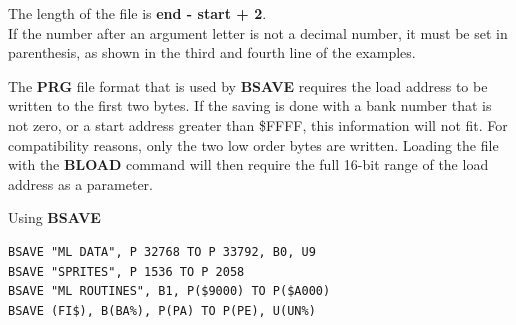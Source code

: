 \begin{description}[leftmargin=2cm,style=nextline]
\item [Remarks:]
   The length of the file is {\bf end - start + 2}. \\
   If the number after an argument letter is not a decimal
   number, it must be set in parenthesis, as shown
   in the third and fourth line of the examples.

   The {\bf PRG} file format that is used by {\bf BSAVE}
   requires the load address to be written to the first two bytes.
   If the saving is done with a bank number that is not zero,
   or a start address greater than \$FFFF, this information will not
   fit. For compatibility reasons, only the two low order bytes
   are written. Loading the file with the {\bf BLOAD} command will then
   require the full 16-bit range of the load address as a parameter.

\item [Examples:] Using {\bf BSAVE}
\begin{tcolorbox}[colback=black,coltext=white]
\verbatimfont{\codefont}
\begin{verbatim}
BSAVE "ML DATA", P 32768 TO P 33792, B0, U9
BSAVE "SPRITES", P 1536 TO P 2058
BSAVE "ML ROUTINES", B1, P($9000) TO P($A000)
BSAVE (FI$), B(BA%), P(PA) TO P(PE), U(UN%)
\end{verbatim}
\end{tcolorbox}
\end{description}


\newpage
